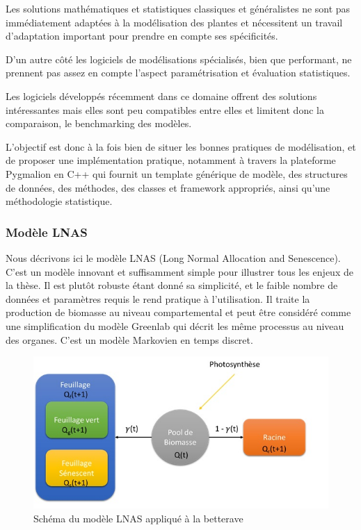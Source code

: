 Les solutions mathématiques et statistiques classiques et généralistes ne sont pas immédiatement adaptées à la modélisation des plantes et nécessitent un travail d’adaptation important pour prendre en compte ses spécificités.

D’un autre côté les logiciels de modélisations spécialisés, bien que performant, ne prennent pas assez en compte l’aspect paramétrisation et évaluation statistiques.

Les logiciels développés récemment dans ce domaine offrent des solutions intéressantes mais elles sont peu compatibles entre elles et limitent donc la comparaison, le benchmarking des modèles.

L’objectif est donc à la fois bien de situer les bonnes pratiques de modélisation, et de proposer une implémentation pratique, notamment à travers la plateforme Pygmalion en C++ qui fournit un template générique de modèle, des structures de données, des méthodes, des classes et framework appropriés, ainsi qu’une méthodologie statistique.

\subsubsection{Modèle LNAS}

Nous décrivons ici le modèle LNAS (Long Normal Allocation and Senescence). C’est un modèle innovant et suffisamment simple pour illustrer tous les enjeux de la thèse. Il est plutôt robuste étant donné sa simplicité, et le faible nombre de données et paramètres requis le rend pratique à l’utilisation. Il traite la production de biomasse au niveau compartemental et peut être considéré comme une simplification du modèle Greenlab qui décrit les même processus au niveau des organes.
C’est un modèle Markovien en temps discret.

\begin{figure}[h]
	\begin{center}
	
	
  \includegraphics[scale=1.0]{./img/sBeetRoot.jpg}
  \caption{Schéma du modèle LNAS appliqué à la betterave}
  \label{fig:sBeetRoot}
  
  \end{center}
\end{figure}

